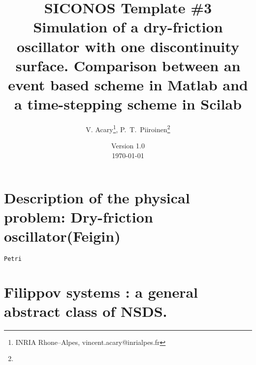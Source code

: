 \documentclass[10pt]{article}
\begin{document}
\thispagestyle{empty}
\title{SICONOS Template \#3 \\
Simulation of a dry-friction oscillator with one discontinuity surface. Comparison between  an event based scheme in Matlab and a time-stepping scheme in Scilab}
\author{V. Acary\footnote{INRIA Rhone--Alpes, vincent.acary@inrialpes.fr}, P.~T.~Piiroinen\footnote{ }}

\date{Version 1.0 \\
\today}
\maketitle



\section{Description of the physical problem: Dry-friction oscillator(Feigin)}
\label{Sec:description}

\texttt{Petri}

\section{Filippov systems : a general abstract class of NSDS.}
\label{Sec:descriptionNSDS}
\end{document}
